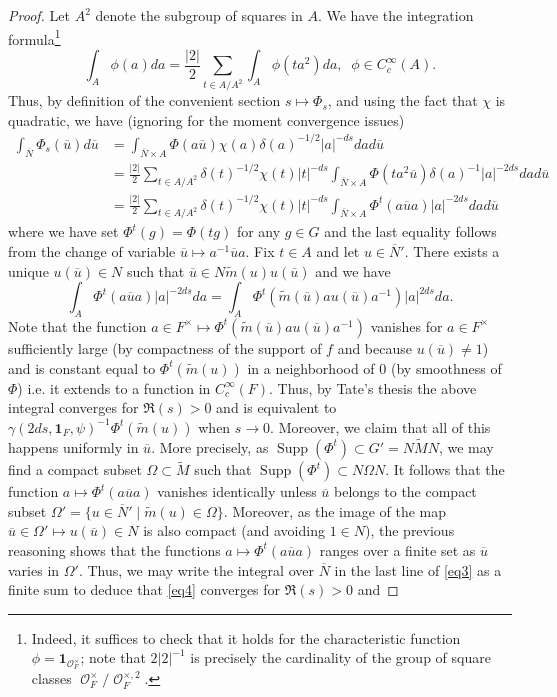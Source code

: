 \documentclass[10pt,a4paper]{amsart}
\DeclareMathOperator{\Supp}{Supp}
\DeclareMathOperator{\cO}{\mathcal{O}}
\def\oN{\overline{N}}
\def\ou{\overline{u}}
\def\tM{\widetilde{M}}
\def\tm{\widetilde{m}}
\begin{document}
	\begin{proof}
		Let $A^2$ denote the subgroup of squares in $A$. We have the integration formula\footnote{Indeed, it suffices to check that it holds for the characteristic function $\phi=\mathbf{1}_{\cO_F^\times}$; note that $2\lvert 2\rvert^{-1}$ is precisely the cardinality of the group of square classes $\cO_F^\times/\cO_F^{\times,2}$.}
		$$\displaystyle \int_A \phi(a)da=\frac{\lvert 2\rvert}{2}\sum_{t\in A/A^2} \int_A \phi(ta^2) da,\;\; \phi\in C_c^\infty(A).$$
		Thus, by definition of the convenient section $s\mapsto \Phi_s$, and using the fact that $\chi$ is quadratic, we have (ignoring for the moment convergence issues)
		\begin{align}\label{eq3}
			\displaystyle \int_{\oN} \Phi_s(\ou) d\ou & =\int_{\oN\times A} \Phi(a\ou) \chi(a)\delta(a)^{-1/2} \lvert a\rvert^{-ds} dad\ou \\
			\nonumber & = \frac{\lvert 2\rvert}{2} \sum_{t\in A/A^2} \delta(t)^{-1/2}\chi(t) \lvert t\rvert^{-ds}\int_{\oN\times A} \Phi(ta^2\ou)\delta(a)^{-1} \lvert a\rvert^{-2ds} dad\ou \\
			\nonumber & = \frac{\lvert 2\rvert}{2}  \sum_{t\in A/A^2} \delta(t)^{-1/2}\chi(t)  \lvert t\rvert^{-ds}\int_{\oN\times A} \Phi^t(a\ou a) \lvert a\rvert^{-2ds} dad\ou
		\end{align}
		where we have set $\Phi^t(g)=\Phi(tg)$ for any $g\in G$ and the last equality follows from the change of variable $\ou\mapsto a^{-1}\ou a$. Fix $t\in A$ and let $u\in \oN'$. There exists a unique $u(\ou)\in N$ such that $\ou\in N \tm(u)u(\ou)$ and we have
		$$\displaystyle \int_A \Phi^t(a\ou a) \lvert a\rvert^{-2ds} da=\int_A \Phi^t(\tm(\ou) a u(\ou)a^{-1}) \lvert a\rvert^{2ds}da.$$
		Note that the function $a\in F^\times \mapsto \Phi^t(\tm(\ou) au(\ou)a^{-1})$ vanishes for $a\in F^\times$ sufficiently large (by compactness of the support of $f$ and because $u(\ou)\neq 1$) and is constant equal to $\Phi^t(\tm(u))$ in a neighborhood of $0$ (by smoothness of $\Phi$) i.e. it extends to a function in $C_c^\infty(F)$. Thus, by Tate's thesis the above integral converges for $\Re(s)>0$ and is equivalent to $\gamma(2ds,\mathbf{1}_F,\psi)^{-1}\Phi^t(\tm(u))$ when $s\to 0$. Moreover, we claim that all of this happens uniformly in $\ou$. More precisely, as $\Supp(\Phi^t)\subset G'=N \tM N$, we may find a compact subset $\Omega\subset \tM$ such that $\Supp(\Phi^t)\subset N \Omega N$. It follows that the function $a\mapsto \Phi^t(a\ou a)$ vanishes identically unless $\ou$ belongs to the compact subset $\Omega'=\{u\in \oN'\mid \tm(u)\in \Omega \}$. Moreover, as the image of the map $\ou\in \Omega'\mapsto u(\ou)\in N$ is also compact (and avoiding $1\in N$), the previous reasoning shows that the functions $a\mapsto \Phi^t(a\ou a)$ ranges over a finite set as $\ou$ varies in $\Omega'$. Thus, we may write the integral over $\oN$ in the last line of \eqref{eq3} as a finite sum to deduce that \eqref{eq4} converges for $\Re(s)>0$ and

\end{proof}
\end{document}
